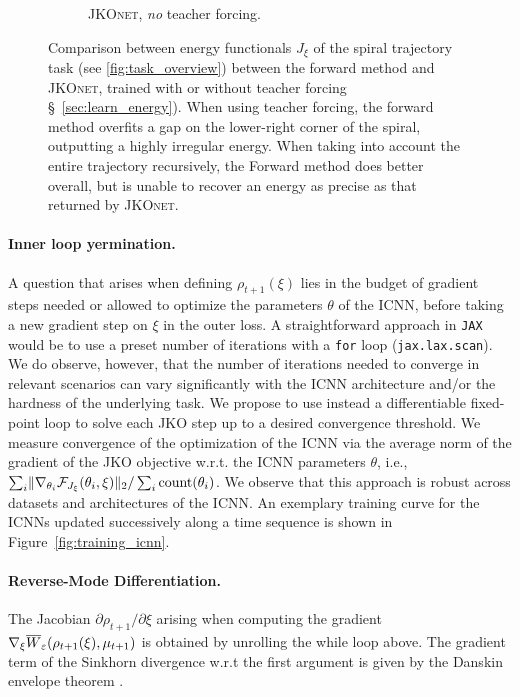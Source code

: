 \begin{figure}[t]
\begin{subfigure}[t]{0.24\textwidth}
         \caption{\textsc{JKOnet}, \protect\newline \emph{no} teacher forcing.}
     \end{subfigure}
	 \caption{Comparison between energy functionals $J_\xi$ of the spiral trajectory task (see \ref{fig:task_overview}) between the forward method and \textsc{JKOnet}, trained with or without teacher forcing \S~\ref{sec:learn_energy}). When using teacher forcing, the forward method overfits a gap on the lower-right corner of the spiral, outputting a highly irregular energy. When taking into account the entire trajectory recursively, the Forward method does better overall, but is unable to recover an energy as precise as that returned by \textsc{JKOnet}.}
	 \label{fig:exp_comp_spiral}
\end{figure}


\paragraph{Inner loop yermination.} A question that arises when defining $\rho_{t+1}(\xi)$ lies in the budget of gradient steps needed or allowed to optimize the parameters $\theta$ of the ICNN, before taking a new gradient step on $\xi$ in the outer loss. A straightforward approach in \texttt{JAX} \citep{jax2018github} would be to use a preset number of iterations with a \texttt{for} loop (\texttt{jax.lax.scan}). 
We do observe, however, that the number of iterations needed to converge in relevant scenarios can vary significantly with the ICNN architecture and/or the hardness of the underlying task.
We propose to use instead a differentiable fixed-point loop to solve each JKO step up to a desired convergence threshold.
We measure convergence of the optimization of the ICNN via the average norm of the gradient of the JKO objective w.r.t. the ICNN parameters $\theta$, i.e., $\sum_i \lVert\nabla_{\theta_i}\mathcal{F}_{J_\xi}(\theta_i, \xi)\rVert_2/\sum_i \text{count}(\theta_i)$.
We observe that this approach is robust across datasets and architectures of the ICNN. An exemplary training curve for the ICNNs updated successively along a time sequence is shown in Figure~\ref{fig:training_icnn}.

\paragraph{Reverse-Mode Differentiation.} The Jacobian $\partial \rho_{t+1} / \partial\xi$ arising when computing the gradient $\nabla_\xi \overline{W}_{\varepsilon}(\rho_{t+1}(\xi), \mu_{t+1})$ is obtained by unrolling the while loop above. The gradient term of the Sinkhorn divergence w.r.t the first argument is given by the Danskin envelope theorem \citep{danskin2012theory}.

